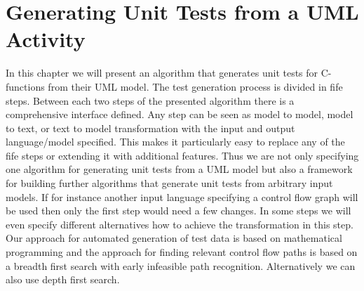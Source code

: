 \chapter{Generating Unit Tests from a UML Activity}
\label{chap:testgeneration}
In this chapter we will present an algorithm that generates unit tests for C-functions from their UML  model. The test generation process is divided in fife steps. Between each two steps of the presented algorithm there is a comprehensive interface defined. Any step can be seen as model to model, model to text, or text to model transformation with the input and output language/model specified. This makes it particularly easy to replace any of the fife steps or extending it with additional features. Thus we are not only specifying one algorithm for generating unit tests from a UML model but also a framework for building further algorithms that generate unit tests from arbitrary input models. If for instance another input language specifying a control flow graph will be used then only the first step would need a few changes. In some steps we will even specify different alternatives how to achieve the transformation in this step.\\
Our approach for automated generation of test data is based on mathematical programming and the approach for finding relevant control flow paths is based on a breadth first search with early infeasible path recognition. Alternatively we can also use depth first search.
